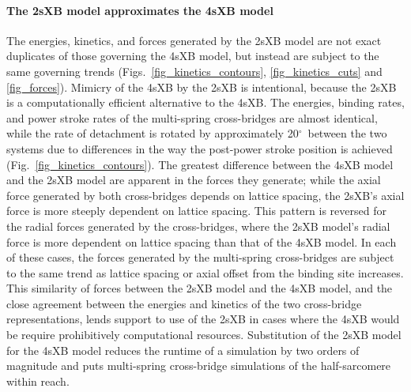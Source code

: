 \documentclass[10pt]{article}
\newcommand{\de}{$^\circ$~} %
\begin{document}
\paragraph*{The 2sXB model approximates the 4sXB model} %
The energies, kinetics, and forces generated by the 2sXB model are not exact duplicates of those governing the 4sXB model, but instead are subject to the same governing trends (Figs.~\ref{fig_kinetics_contours}, \ref{fig_kinetics_cuts} and \ref{fig_forces}). 
Mimicry of the 4sXB by the 2sXB is intentional, because the 2sXB is a computationally efficient alternative to the 4sXB\@.  
The energies, binding rates, and power stroke rates of the multi-spring cross-bridges are almost identical, while the rate of detachment is rotated by approximately 20\de between the two systems due to differences in the way the post-power stroke position is achieved (Fig.~\ref{fig_kinetics_contours}).
The greatest difference between the 4sXB model and the 2sXB model are apparent in the forces they generate; while the axial force generated by both cross-bridges depends on lattice spacing, the 2sXB's axial force is more steeply dependent on lattice spacing. 
This pattern is reversed for the radial forces generated by the cross-bridges, where the 2sXB model's radial force is more dependent on lattice spacing than that of the 4sXB model.  
In each of these cases, the forces generated by the multi-spring cross-bridges are subject to the same trend as lattice spacing or axial offset from the binding site increases.
This similarity of forces between the 2sXB model and the 4sXB model, and the close agreement between the energies and kinetics of the two cross-bridge representations, lends support to use of the 2sXB in cases where the 4sXB would be require prohibitively computational resources.
Substitution of the 2sXB model for the 4sXB model reduces the runtime of a simulation by two orders of magnitude and puts multi-spring cross-bridge simulations of the half-sarcomere within reach.
\end{document}

